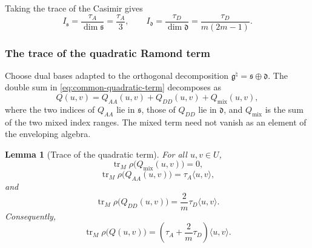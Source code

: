 \documentclass[11pt,reqno]{amsart}
\newtheorem{lemma}[theorem]{Lemma}
\theoremstyle{definition}
\theoremstyle{remark}
\begin{document}
Taking the trace of the Casimir gives
\begin{equation*}
  I_{\mathfrak s}
  =
  \frac{\tau_A}{\dim\mathfrak s}
  =
  \frac{\tau_A}{3},
  \qquad
  I_{\mathfrak d}
  =
  \frac{\tau_D}{\dim\mathfrak d}
  =
  \frac{\tau_D}{m(2m-1)}.
\end{equation*}

\subsubsection{The trace of the quadratic Ramond term}


Choose dual bases adapted to the orthogonal decomposition
\(\mathfrak g^\natural=\mathfrak s\oplus\mathfrak d\).  The double sum
in \eqref{eq:common-quadratic-term} decomposes as
\begin{equation*}
  Q(u,v)
  =
  Q_{AA}(u,v)+Q_{DD}(u,v)+Q_{\mathrm{mix}}(u,v),
\end{equation*}
where the two indices of \(Q_{AA}\) lie in \(\mathfrak s\), those of
\(Q_{DD}\) lie in \(\mathfrak d\), and
\(Q_{\mathrm{mix}}\) is the sum of the two mixed index ranges.  The
mixed term need not vanish as an element of the enveloping algebra.

\begin{lemma}[Trace of the quadratic term]
\label{dl:lem:Dl-trace-quadratic-Ramond-term}
For all \(u,v\in U\),
\begin{equation}
  \operatorname{tr}_M\rho\bigl(Q_{\mathrm{mix}}(u,v)\bigr)=0,
  \label{dl:eq:Dl-trace-quadratic-mixed-term}
\end{equation}
\begin{equation}
  \operatorname{tr}_M\rho\bigl(Q_{AA}(u,v)\bigr)
  =
  \tau_A\langle u,v\rangle,
  \label{dl:eq:Dl-trace-quadratic-A-term}
\end{equation}
and
\begin{equation}
  \operatorname{tr}_M\rho\bigl(Q_{DD}(u,v)\bigr)
  =
  \frac2m
  \tau_D\langle u,v\rangle.
  \label{dl:eq:Dl-trace-quadratic-D-term}
\end{equation}
Consequently,
\begin{equation}
  \operatorname{tr}_M\rho\bigl(Q(u,v)\bigr)
  =
  \left(
    \tau_A+\frac2m\tau_D
  \right)
  \langle u,v\rangle.
  \label{dl:eq:Dl-trace-total-quadratic-term}
\end{equation}
\end{lemma}
\end{document}
